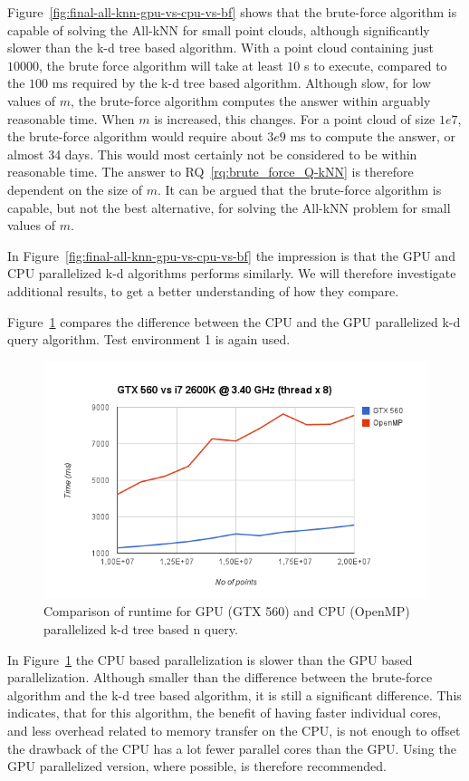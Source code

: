 Figure~\ref{fig:final-all-knn-gpu-vs-cpu-vs-bf} shows that the brute-force algorithm is capable of solving the All-kNN for small point clouds, although significantly slower than the k-d tree based algorithm. With a point cloud containing just $10000$, the brute force algorithm will take at least $10$ s to execute, compared to the $100$ ms required by the k-d tree based algorithm. Although slow, for low values of $m$, the brute-force algorithm computes the answer within arguably reasonable time. When $m$ is increased, this changes. For a point cloud of size $1e7$, the brute-force algorithm would require about $3e9$ ms to compute the answer, or almost 34 days. This would most certainly not be considered to be within reasonable time. The answer to RQ~\ref{rq:brute_force_Q-kNN} is therefore dependent on the size of $m$. It can be argued that the brute-force algorithm is capable, but not the best alternative, for solving the All-kNN problem for small values of $m$.

In Figure~\ref{fig:final-all-knn-gpu-vs-cpu-vs-bf} the impression is that the GPU and CPU parallelized k-d algorithms performs similarly. We will therefore investigate additional results, to get a better understanding of how they compare.

Figure~\ref{fig:v17-gpu-vs-cpu} compares the difference between the CPU and the GPU parallelized k-d query algorithm. Test environment 1 is again used.

\begin{figure}[ht!]
    \centering
    \includegraphics[width=120mm]{../gfx/v17-gpu-vs-cpu.png}
    \caption{Comparison of runtime for GPU (GTX 560) and CPU (OpenMP) parallelized k-d tree based n query.}
    \label{fig:v17-gpu-vs-cpu}
\end{figure}

In Figure~\ref{fig:v17-gpu-vs-cpu} the CPU based parallelization is slower than the GPU based parallelization. Although smaller than the difference between the brute-force algorithm and the k-d tree based algorithm, it is still a significant difference. This indicates, that for this algorithm, the benefit of having faster individual cores, and less overhead related to memory transfer on the CPU, is not enough to offset the drawback of the CPU has a lot fewer parallel cores than the GPU. Using the GPU parallelized version, where possible, is therefore recommended.

